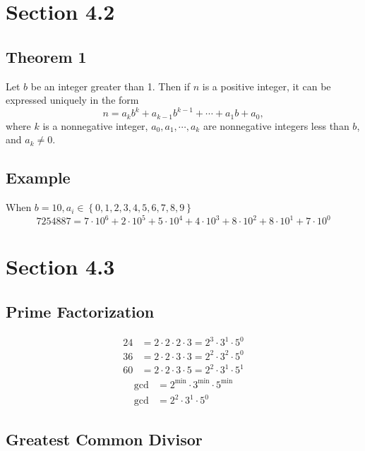 \documentclass{article}
\begin{document}
\section{Section 4.2}

\subsection{Theorem 1}

Let $ b $ be an integer greater than 1. Then if $ n $ is a positive integer, it can be expressed uniquely in the form
\begin{equation}
	n = a_kb^k + a_{k - 1}b^{k - 1} + \cdots + a_1b + a_0,
\end{equation}
where $ k $ is a nonnegative integer, $ a_0, a_1, \cdots, a_k $ are nonnegative integers less than $ b $, and $ a_k \neq 0 $.

\subsection{Example}

When $ b = 10, a_i \in \left\{ 0, 1, 2, 3, 4, 5, 6, 7, 8, 9 \right\} $
\begin{equation*}
	7254887 = 7 \cdot 10^6 + 2 \cdot 10^5 + 5 \cdot 10^4 + 4 \cdot 10^3 + 8 \cdot 10^2 + 8 \cdot 10^1 + 7 \cdot 10^0
\end{equation*}

\section{Section 4.3}

\subsection{Prime Factorization}

\begin{align*}
	24 & = 2 \cdot 2 \cdot 2 \cdot 3 = 2^3 \cdot 3^1 \cdot 5^0 \\
	36 & = 2 \cdot 2 \cdot 3 \cdot 3 = 2^2 \cdot 3^2 \cdot 5^0 \\
	60 & = 2 \cdot 2 \cdot 3 \cdot 5 = 2^2 \cdot 3^1 \cdot 5^1
\end{align*}
\begin{align*}
	\text{gcd} & = 2^{\min} \cdot 3^{\min} \cdot 5^{\min} \\
	\text{gcd} & = 2^{2} \cdot 3^{1} \cdot 5^{0}
\end{align*}

\subsection{Greatest Common Divisor}
\end{document}
